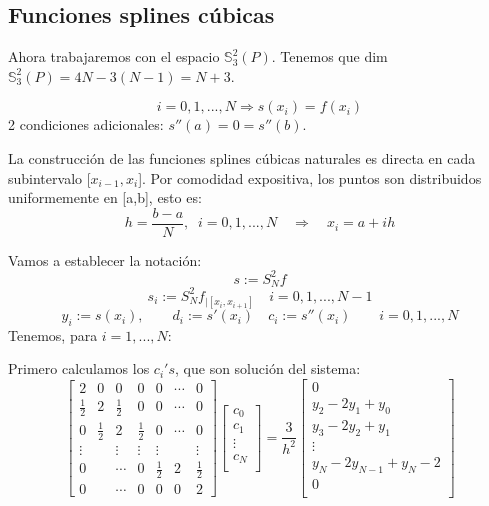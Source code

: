 \subsection{Funciones splines cúbicas}
Ahora trabajaremos con el espacio $\mathbb{S}_3^2(P)$. Tenemos que dim$\mathbb{S}_3^2(P) = 4N-3(N-1) = N+3$.

\begin{ndef}
\[ i=0,1,...,N \Rightarrow s(x_i) = f(x_i) \]
2 condiciones adicionales: $s''(a) = 0 = s''(b)$.
\end{ndef}

La construcción de las funciones splines cúbicas naturales es directa en cada subintervalo [$x_{i-1},x_i$]. Por comodidad expositiva, los puntos son distribuidos uniformemente en [a,b], esto es:
\[ h= \frac{b-a}{N}, \; \; i=0,1,...,N \quad \Rightarrow \quad x_i=a+ih \]

Vamos a establecer la notación:
\[ s:= S_N^2f \]
\[ s_i := S_N^2 f_{\vert \left[ x_i, x_{i+1} \right]} \quad i=0,1,...,N-1 \]
\[ y_i:=s(x_i), \qquad d_i:=s'(x_i) \quad c_i:=s''(x_i) \qquad i=0,1,...,N \]
Tenemos, para $i=1,...,N$:

Primero calculamos los $c_i's$, que son solución del sistema:
\[ \begin{bmatrix}
2 & 0 & 0 & 0 & 0 & \cdots & 0 \\
\frac{1}{2} & 2 & \frac{1}{2} & 0 & 0 & \cdots & 0 \\
0 & \frac{1}{2} & 2 & \frac{1}{2} & 0 & \cdots & 0 \\
\vdots & & \vdots & \vdots & \vdots & & \vdots \\
0 & & \cdots & 0 & \frac{1}{2} & 2 & \frac{1}{2} \\
0 & & \cdots & 0 & 0 & 0 & 2 
\end{bmatrix}
\begin{bmatrix}
c_0 \\
c_1 \\
\vdots \\
c_N \\
\end{bmatrix}
= \frac{3}{h^2}
\begin{bmatrix}
0 \\
y_2-2y_1+y_0 \\
y_3-2y_2+y_1 \\
\vdots \\
y_N-2y_{N-1} + y_N-2 \\
0 \\
\end{bmatrix}
 \]

